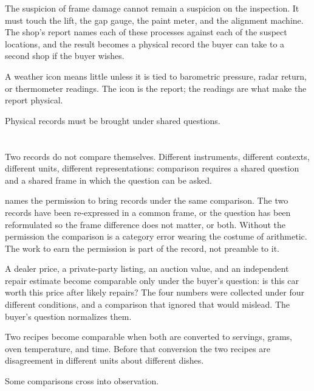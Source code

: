 The suspicion of frame damage cannot remain a suspicion on the inspection.
It must touch the lift, the gap gauge, the paint meter, and the alignment
machine. The shop's report names each of these processes against each of
the suspect locations, and the result becomes a physical record the buyer
can take to a second shop if the buyer wishes.

A weather icon means little unless it is tied to barometric pressure,
radar return, or thermometer readings. The icon is the report; the
readings are what make the report physical.

Physical records must be brought under shared questions.

\section{}
\label{se:comparable}

Two records do not compare themselves. Different instruments, different
contexts, different units, different representations: comparison requires
a shared question and a shared frame in which the question can be asked.

 names the permission to bring records under the same
comparison. The two records have been re-expressed in a common frame, or
the question has been reformulated so the frame difference does not
matter, or both. Without the permission the comparison is a category
error wearing the costume of arithmetic. The work to earn the permission
is part of the record, not preamble to it.

A dealer price, a private-party listing, an auction value, and an
independent repair estimate become comparable only under the buyer's
question: is this car worth this price after likely repairs? The four
numbers were collected under four different conditions, and a comparison
that ignored that would mislead. The buyer's question normalizes them.

Two recipes become comparable when both are converted to servings,
grams, oven temperature, and time. Before that conversion the two
recipes are disagreement in different units about different dishes.

Some comparisons cross into observation.

\section{}
\label{se:observed}


